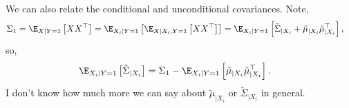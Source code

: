 \documentclass{article}
\begin{document}
We can also relate the conditional and unconditional covariances.
Note,
\begin{align*}
  \Sigma_1
  &= \E_{X \mid Y=1} \left[ X X^\top \right] 
  = \E_{X_i \mid Y=1} \left[ \E_{X \mid X_i, Y=1} \left[ X X^\top \right] \right] 
  = \E_{X_i \mid Y=1} \left[ \tilde{\Sigma}_{\mid X_i} + \tilde{\mu}_{\mid X_i} \tilde{\mu}_{\mid X_i}^\top \right],
\end{align*}
so,
\begin{align*}
  \E_{X_i \mid Y=1} \left[ \tilde{\Sigma}_{\mid X_i} \right]
  &= \Sigma_1 - \E_{X_i \mid Y=1} \left[ \tilde{\mu}_{\mid X_i} \tilde{\mu}_{\mid X_i}^\top \right].
\end{align*}
I don't know how much more we can say about $\tilde{\mu}_{\mid X_i}$ or $\tilde{\Sigma}_{\mid X_i}$ in general.
\end{document}
